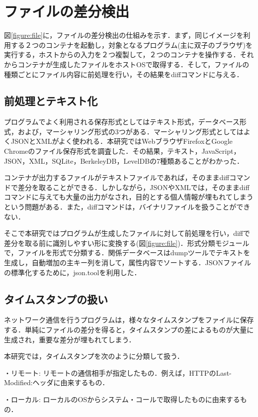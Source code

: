 \documentclass[submit]{ipsj}
\begin{document}
\section{ファイルの差分検出}
\label{cha:file}

図\ref{figure:file}に，ファイルの差分検出の仕組みを示す．まず，同じイメージを利用する２つのコンテナを起動し，対象となるプログラム(主に双子のブラウザ)を実行する，ホストからの入力を２つ複製して，２つのコンテナを操作する．それからコンテナが生成したファイルをホストOSで取得する．そして，ファイルの種類ごとにファイル内容に前処理を行い，その結果をdiffコマンドに与える．

\subsection{前処理とテキスト化}
\label{sec:prep}
プログラムでよく利用される保存形式としてはテキスト形式，データベース形式，および，マーシャリング形式の3つがある．マーシャリング形式としてはよくJSONとXMLがよく使われる．本研究ではWebブラウザFirefoxとGoogle Chromeのファイル保存形式を調査した．その結果，テキスト，JavaScript，JSON，XML，SQLite，BerkeleyDB，LevelDBの7種類あることがわかった．

コンテナが出力するファイルがテキストファイルであれば，そのままdiffコマンドで差分を取ることができる．しかしながら，JSONやXMLでは，そのままdiffコマンドに与えても大量の出力がなされ，目的とする個人情報が埋もれてしまうという問題がある．また，diffコマンドは，バイナリファイルを扱うことができない．

そこで本研究ではプログラムが生成したファイルに対して前処理を行い，diffで差分を取る前に識別しやすい形に変換する(図\ref{figure:file})．形式分類モジュールで，ファイルを形式で分類する．関係データベースはdumpツールでテキストを生成し，自動増加の主キー列を消して，属性内容でソートする．JSONファイルの標準化するために，json.toolを利用した．


\subsection{タイムスタンプの扱い}
\label{cha:timestamp}
ネットワーク通信を行うプログラムは，様々なタイムスタンプをファイルに保存する．単純にファイルの差分を得ると，タイムスタンプの差によるものが大量に生成され，重要な差分が埋もれてしまう．

本研究では，タイムスタンプを次のように分類して扱う．


\begin{description}
\item{・リモート: }
リモートの通信相手が指定したもの．例えば，HTTPのLast-Modified:ヘッダに由来するもの．
\item{・ローカル: }
ローカルのOSからシステム・コールで取得したものに由来するもの．
\end{description}
\end{document}

